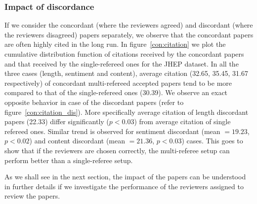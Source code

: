 \subsubsection{Impact of discordance}
If we consider the concordant (where the reviewers agreed) and discordant (where the reviewers
disagreed) papers separately, we observe that the concordant papers are often highly cited in the long run. In figure~\ref{con:citation} 
we plot the cumulative distribution function 
of citations received by the concordant papers and that received by the single-refereed ones for the JHEP dataset. 
In all the three cases (length, sentiment and content), average citation (32.65, 35.45, 31.67 respectively) of concordant multi-refereed 
accepted papers tend to be more compared to that of the single-refereed ones (30.39). We 
observe an exact opposite behavior in case of the discordant papers (refer to figure~\ref{con:citation_dis}). 
More specifically average citation of length discordant papers (22.33) differ significantly ($p < 0.03$) from average citation of single refereed ones. Similar trend is observed 
for sentiment discordant (mean $=19.23$, $p < 0.02$) and content discordant (mean $=21.36$, $p < 0.03$) cases. 
This goes to show that if the reviewers are chosen correctly, the multi-referee setup can perform better than a single-referee setup. 

As we shall see in the next section, the impact  of  the papers can be understood in further details if we  investigate the performance of the reviewers assigned to review 
the papers. 



